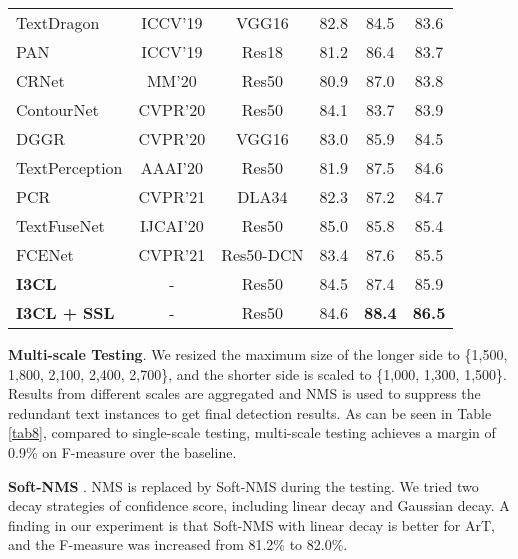 \begin{table}[ht]
\begin{center}
{\begin{tabular}{l|c|c|ccc}
    TextDragon \citep{textdragon}         & ICCV'19     & VGG16          & 82.8 & 84.5 & 83.6 \\
    PAN \citep{pan}                       & ICCV'19     & Res18          & 81.2 & 86.4 & 83.7 \\
    CRNet \citep{crnet}                   & MM'20       & Res50          & 80.9 & 87.0 & 83.8 \\
    ContourNet \citep{contournet}         & CVPR'20     & Res50          & 84.1 & 83.7 & 83.9 \\
    DGGR \citep{dggrn}                    & CVPR'20     & VGG16          & 83.0 & 85.9 & 84.5 \\
    TextPerception \citep{textperceptron} & AAAI'20     & Res50          & 81.9 & 87.5 & 84.6 \\
    PCR \citep{pcr}                       & CVPR'21     & DLA34          & 82.3 & 87.2 & 84.7 \\
    TextFuseNet \citep{textfusenet}       & IJCAI'20    & Res50          & 85.0 & 85.8 & 85.4 \\
    FCENet \citep{fcenet}                 & CVPR'21     & Res50-DCN      & 83.4 & 87.6 & 85.5 \\
    \hline
    \textbf{I3CL}                     & -                & Res50          & 84.5 & 87.4 & 85.9\\
    \textbf{I3CL + SSL}               & -                & Res50          & 84.6 & \textbf{88.4} & \textbf{86.5}\\
\hline\hline
\end{tabular}}
\end{center}
\end{table}


\textbf{Multi-scale Testing}. We resized the maximum size of the longer side to \{1,500, 1,800, 2,100, 2,400, 2,700\}, and the shorter side is scaled to \{1,000, 1,300, 1,500\}. Results from different scales are aggregated and NMS is used to suppress the redundant text instances to get final detection results. As can be seen in Table \ref{tab8}, compared to single-scale testing, multi-scale testing achieves a margin of 0.9\% on F-measure over the baseline.

\textbf{Soft-NMS} \citep{softnms}. NMS is replaced by Soft-NMS during the testing. We tried two decay strategies of confidence score, including linear decay and Gaussian decay. A finding in our experiment is that Soft-NMS with linear decay is better for ArT, and the F-measure was increased from 81.2\% to 82.0\%.

